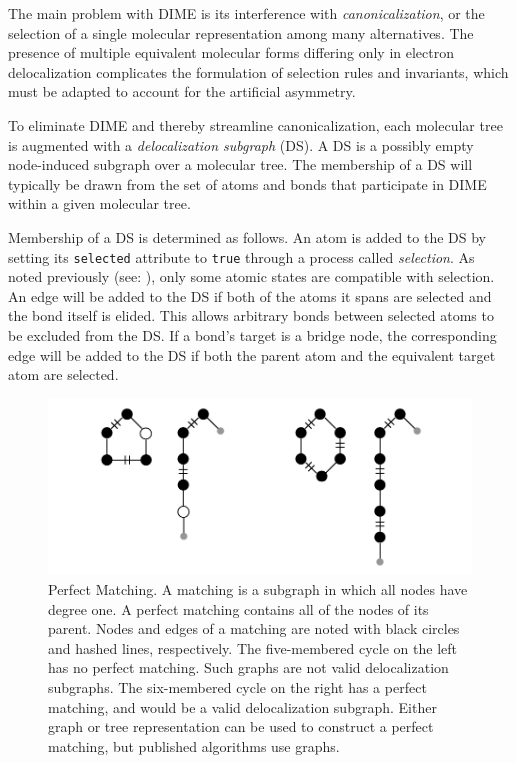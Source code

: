 \documentclass{article}
\def\ttt{\texttt}
\begin{document}
The main problem with DIME is its interference with \textit{canonicalization}, or the selection of a single molecular representation among many alternatives. The presence of multiple equivalent molecular forms differing only in electron delocalization complicates the formulation of selection rules and invariants, which must be adapted to account for the artificial asymmetry.

To eliminate DIME and thereby streamline canonicalization, each molecular tree is augmented with a \textit{delocalization subgraph} (DS). A DS is a possibly empty node-induced subgraph over a molecular tree. The membership of a DS will typically be drawn from the set of atoms and bonds that participate in DIME within a given molecular tree.

Membership of a DS is determined as follows. An atom is added to the DS by setting its \ttt{selected} attribute to \ttt{true} through a process called \textit{selection}. As noted previously (see: ), only some atomic states are compatible with selection. An edge will be added to the DS if both of the atoms it spans are selected and the bond itself is elided. This allows arbitrary bonds between selected atoms to be excluded from the DS. If a bond's target is a bridge node, the corresponding edge will be added to the DS if both the parent atom and the equivalent target atom are selected.

\begin{figure}
    \centering
    \includegraphics[width=\columnwidth]{matching.pdf}
    \caption{Perfect Matching. A matching is a subgraph in which all nodes have degree one. A perfect matching contains all of the nodes of its parent. Nodes and edges of a matching are noted with black circles and hashed lines, respectively. The five-membered cycle on the left has no perfect matching. Such graphs are not valid delocalization subgraphs. The six-membered cycle on the right has a perfect matching, and would be a valid delocalization subgraph. Either graph or tree representation can be used to construct a perfect matching, but published algorithms use graphs.}
    \label{fig:perfect-matching}
\end{figure}
\end{document}
